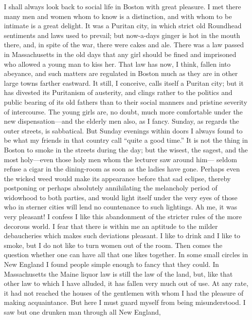 I shall always look back to social life in Boston with great
pleasure.  I met there many men and women whom to know is a
distinction, and with whom to be intimate is a great delight.  It
was a Puritan city, in which strict old Roundhead sentiments and
laws used to prevail; but now-a-days ginger is hot in the mouth
there, and, in spite of the war, there were cakes and ale.  There
was a law passed in Massachusetts in the old days that any girl
should be fined and imprisoned who allowed a young man to kiss her.
That law has now, I think, fallen into abeyance, and such matters
are regulated in Boston much as they are in other large towns
farther eastward.  It still, I conceive, calls itself a Puritan
city; but it has divested its Puritanism of austerity, and clings
rather to the politics and public bearing of its old fathers than
to their social manners and pristine severity of intercourse.  The
young girls are, no doubt, much more comfortable under the new
dispensation---and the elderly men also, as I fancy.  Sunday, as
regards the outer streets, is sabbatical.  But Sunday evenings
within doors I always found to be what my friends in that country
call ``quite a good time.''  It is not the thing in Boston to smoke
in the streets during the day; but the wisest, the sagest, and the
most holy---even those holy men whom the lecturer saw around him---%
seldom refuse a cigar in the dining-room as soon as the ladies have
gone.  Perhaps even the wicked weed would make its appearance
before that sad eclipse, thereby postponing or perhaps absolutely
annihilating the melancholy period of widowhood to both parties,
and would light itself under the very eyes of those who in sterner
cities will lend no countenance to such lightings.  Ah me, it was
very pleasant!  I confess I like this abandonment of the stricter
rules of the more decorous world.  I fear that there is within me
an aptitude to the milder debaucheries which makes such deviations
pleasant.  I like to drink and I like to smoke, but I do not like
to turn women out of the room.  Then comes the question whether one
can have all that one likes together.  In some small circles in New
England I found people simple enough to fancy that they could.  In
Massachusetts the Maine liquor law is still the law of the land,
but, like that other law to which I have alluded, it has fallen
very much out of use.  At any rate, it had not reached the houses
of the gentlemen with whom I had the pleasure of making
acquaintance.  But here I must guard myself from being
misunderstood.  I saw but one drunken man through all New England,
